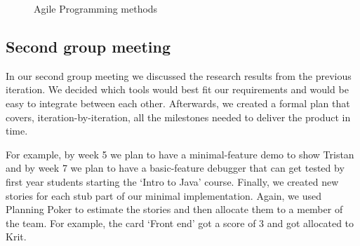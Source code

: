 \documentclass[11pt, a4paper]{article}
\begin{document}
\begin{figure}[ht]
\centering
{}
\quad
{}
\caption{Agile Programming methods}
\label{fig:figure}
\end{figure}

\subsection{Second group meeting}
In our second group meeting we discussed the research results from the previous iteration. We decided which tools would best fit our requirements and would be easy to integrate between each other. Afterwards, we created a formal plan that covers, iteration-by-iteration, all the milestones needed to deliver the product in time. 

For example, by week 5 we plan to have a minimal-feature demo to show Tristan and by week 7 we plan to have a basic-feature debugger that can get tested by first year students starting the `Intro to Java' course. Finally, we created new stories for each stub part of our minimal implementation. Again, we used Planning Poker to estimate the stories and then allocate them to a member of the team. For example, the card `Front end' got a score of 3 and got allocated to Krit.
\end{document}

